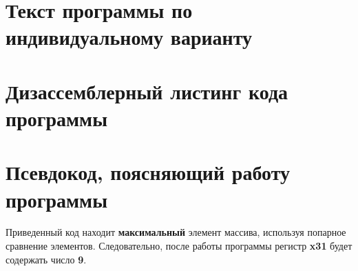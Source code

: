 
\section{Текст программы по индивидуальному варианту}



\section{Дизассемблерный листинг кода программы}



\section{Псевдокод, поясняющий работу программы}



Приведенный код находит \textbf{максимальный} элемент массива, используя попарное сравнение элементов. Следовательно, после работы программы регистр \textbf{x31} будет содержать число \textbf{9}.